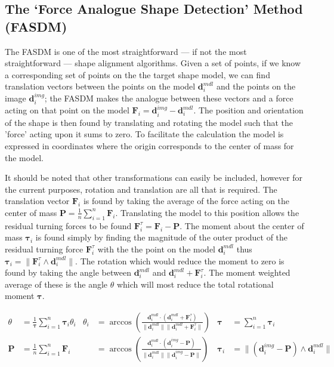 \subsection{The `Force Analogue Shape Detection' Method (FASDM)}\label{sec:ForceAnalogue}
\newcommand{\pos}{\mathbf{P}}
\newcommand{\F}{\mathbf{F}_i}
\newcommand{\Ft}{\mathbf{F}^\tau_i}
\newcommand{\dm}{\mathbf{d}^{m{\scriptscriptstyle dl} }_i}
\newcommand{\di}{\mathbf{d}^{i{\scriptscriptstyle mg} }_i}
\newcommand{\Mt}{\mathbf{\tau}_i}
The FASDM is one of the most straightforward --- if not the most straightforward --- shape alignment algorithms. Given a set of points, if we know a corresponding set of points on the the target shape model, we can find translation vectors between the points on the model $\dm$ and the points  on the image $\di$; the FASDM makes the analogue between these vectors and a force acting on that point on the model $\F=\di-\dm$. The position and orientation of the shape is then found by translating and rotating the model such that the 'force' acting upon it sums to zero. To facilitate the calculation the model is expressed in coordinates where the origin corresponds to the center of mass for the model.

It should be noted that other transformations can easily be included, however for the current purposes, rotation and translation are all that is required.
The translation vector $\F$ is found by taking the average of the force acting on the center of mass $\pos= \frac{1} {n} \sum_{i=1}^n \F$. 
Translating the model to this position allows the residual turning forces to be found $\Ft = \F - \pos$. 
The moment about the center of mass $\Mt$ is found simply by finding the magnitude of the outer product of the residual turning force $\Ft$ with the the point on the model $\dm$ thus $\Mt = \lVert \Ft \wedge \dm \rVert$. 
The rotation which would reduce the moment to zero is found by taking the angle between $\dm$ and $\dm+\Ft$.
The moment weighted average of these is the angle $\theta$ which will most reduce the total rotational moment $\mathbf{\tau} $. 

\begin{align*}
\theta &= \frac{1} {\mathbf{\tau}} \sum_{i=1}^{n} \Mt \theta_i &
\theta_i &=  \arccos \left(\frac{\dm \cdot (\dm+\Ft)}{\lVert \dm \rVert \lVert \dm+\Ft \rVert}\right)  &
\mathbf{\tau} &= \sum_{i=1}^{n} \Mt \\
\pos &= \frac{1} {n} \sum_{i=1}^n \F &
  &=  \arccos \left(\frac{\dm \cdot (\di - \pos)}{\lVert \dm \rVert \lVert \di - \pos \rVert}\right)  &
\Mt &= \lVert (\di - \pos) \wedge \dm \rVert
\end{align*}

